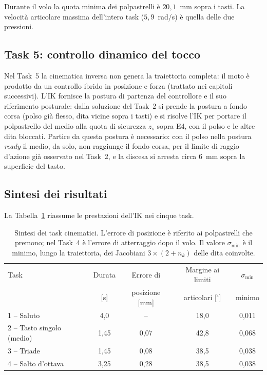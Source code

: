 Durante il volo la quota minima dei polpastrelli \`e $20{,}1$~mm sopra i tasti. La velocit\`a articolare massima dell'intero task ($5{,}9$~rad/s) \`e quella delle due pressioni.

\subsection{Task 5: controllo dinamico del tocco}

Nel Task~5 la cinematica inversa non genera la traiettoria completa: il moto \`e prodotto da un controllo ibrido in posizione e forza (trattato nei capitoli successivi). L'IK fornisce la postura di partenza del controllore e il suo riferimento posturale: dalla soluzione del Task~2 si prende la postura a fondo corsa (polso gi\`a flesso, dita vicine sopra i tasti) e si risolve l'IK per portare il polpastrello del medio alla quota di sicurezza $z_s$ sopra E4, con il polso e le altre dita bloccati. Partire da questa postura \`e necessario: con il polso nella postura \textit{ready} il medio, da solo, non raggiunge il fondo corsa, per il limite di raggio d'azione gi\`a osservato nel Task~2, e la discesa si arresta circa $6$~mm sopra la superficie del tasto.

\subsection{Sintesi dei risultati}

La Tabella~\ref{tab:summary_ik} riassume le prestazioni dell'IK nei cinque task.

\begin{table}[htbp]
    \centering
    \renewcommand{\arraystretch}{1.1}
    \begin{tabular}{|l|c|c|c|c|}
        \hline
        Task & Durata & Errore di & Margine ai limiti & $\sigma_{\min}$\\
         & [s] & posizione [mm] & articolari [$^\circ$] & minimo\\ \hline \hline
        1 -- Saluto & 4,0 & -- & 18,0 & 0,011\\
        2 -- Tasto singolo (medio) & 1,45 & 0,07 & 42,8 & 0,068\\
        3 -- Triade & 1,45 & 0,08 & 38,5 & 0,038\\
        4 -- Salto d'ottava & 3,25 & 0,28 & 38,5 & 0,038\\ \hline
    \end{tabular}
    \caption{Sintesi dei task cinematici. L'errore di posizione \`e riferito ai polpastrelli che premono; nel Task~4 \`e l'errore di atterraggio dopo il volo. Il valore $\sigma_{\min}$ \`e il minimo, lungo la traiettoria, dei Jacobiani $3\times(2+n_k)$ delle dita coinvolte.}
    \label{tab:summary_ik}
\end{table}

